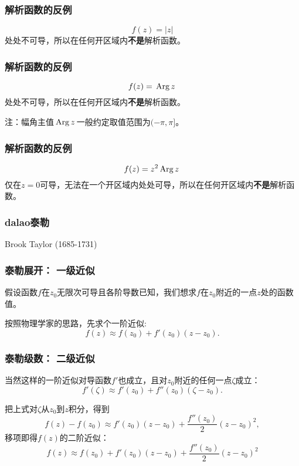 \documentclass[CJK]{beamer}
\begin{document}
\begin{frame}
  \frametitle{解析函数的反例}
  
  \bex
  $$f(z) = |z|$$
  处处不可导，所以在任何开区域内{\bf 不是}解析函数。
  \eex
  
\end{frame}


\begin{frame}
  \frametitle{解析函数的反例}
  
  \bex
  $$f(z) = \,\mathrm{Arg}\,z\,$$
  处处不可导，所以在任何开区域内{\bf 不是}解析函数。
  \eex

  \skiplines

{\scriptsize  注：幅角主值$\,\mathrm{Arg}\,z\,$一般约定取值范围为$(-\pi,\pi]$。}
  
\end{frame}

\begin{frame}
  \frametitle{解析函数的反例}
  
  \bex
  $$f(z) = z^2 \,\mathrm{Arg}\,z\,$$
  仅在$z=0$可导，无法在一个开区域内处处可导，所以在任何开区域内{\bf 不是}解析函数。
  \eex
  
\end{frame}


\begin{frame}
  \frametitle{dalao泰勒}
  
  \bcenter

  Brook Taylor (1685-1731)
  \ecenter
  
\end{frame}

\begin{frame}
  \frametitle{泰勒展开： 一级近似}
  
  假设函数$f$在$z_0$无限次可导且各阶导数已知，我们想求$f$在$z_0$附近的一点$z$处的函数值。


  \skiplines
  
  按照物理学家的思路，先求个一阶近似:
  \begin{equation}
    f(z) \approx f(z_0) + f'(z_0)(z-z_0). \nonumber
  \end{equation}
  
  
\end{frame}

\begin{frame}
  \frametitle{泰勒级数： 二级近似}
  
  当然这样的一阶近似对导函数$f'$也成立，且对$z_0$附近的任何一点$\zeta$成立：
$$    f'(\zeta) \approx f'(z_0) + f''(z_0)(\zeta-z_0).  $$

  把上式对$\zeta$从$z_0$到$z$积分，得到
  $$     f(z) - f(z_0) \approx f'(z_0)(z-z_0) + \frac{f''(z_0)}{2} (z-z_0)^2 ,$$
  移项即得$f(z)$的二阶近似：
  \begin{equation}
    f(z) \approx f(z_0)  + f'(z_0)(z-z_0) + \frac{f''(z_0)}{2} (z-z_0)^2 \nonumber
  \end{equation}
  
  
\end{frame}
\end{document}
